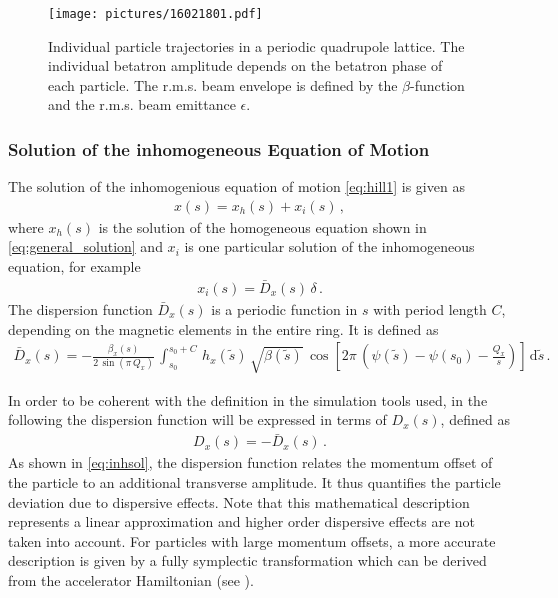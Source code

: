 \begin{figure}[b]  
    \centering
    \texttt{[image: pictures/16021801.pdf]}
    \caption{Individual particle trajectories in a periodic quadrupole lattice. The individual betatron amplitude depends on the betatron phase of each particle. The r.m.s. beam envelope is defined by the $\beta$-function and the r.m.s. beam emittance $\epsilon$.}  
    \label{pic:16021801}
\end{figure}


\subsubsection{Solution of the inhomogeneous Equation of Motion}


The solution of the inhomogenious equation of motion \eqref{eq:hill1} is given as
%
\begin{align}
  x(s) = x_h(s) + x_i(s) \, , \label{eq:inhsol}
\end{align}
%
where $x_h(s)$ is the solution of the homogeneous equation shown in \eqref{eq:general_solution} and $x_i$ is one particular solution of the inhomogeneous equation, for example
%
\begin{align}
  x_i(s) = \bar{D}_x(s) \, \delta \, .
\end{align}
%
The dispersion function $\bar{D}_x(s)$ is a periodic function in $s$ with period length $C$, depending on the magnetic elements in the entire ring. It is defined as
%
\begin{align}
  \bar{D}_x (s) = - \frac{\beta_x(s)}{2 \, \sin (\pi \, Q_x)} \, \int_{s_0}^{s_0+C} \, h_x(\tilde{s}) \, \sqrt{\beta(\tilde{s})} \, \cos \left[ 2 \pi \, \left( \psi(\tilde{s}) - \psi(s_0) - \frac{Q_x}{s} \right) \right] \, \mathrm{d} \tilde{s} \, .
\end{align}

In order to be coherent with the definition in the simulation tools used, in the following the dispersion function will be expressed in terms of $D_x(s)$, defined as
%
\begin{align}
  D_x(s) = -\bar{D}_x(s) \, .
\end{align}
%
As shown in \eqref{eq:inhsol}, the dispersion function relates the momentum offset of the particle to an additional transverse amplitude. It thus quantifies the particle deviation due to dispersive effects. Note that this mathematical description represents a linear approximation and higher order dispersive effects are not taken into account. For particles with large momentum offsets, a more accurate description is given by a fully symplectic transformation which can be derived from the accelerator Hamiltonian (see ). 



